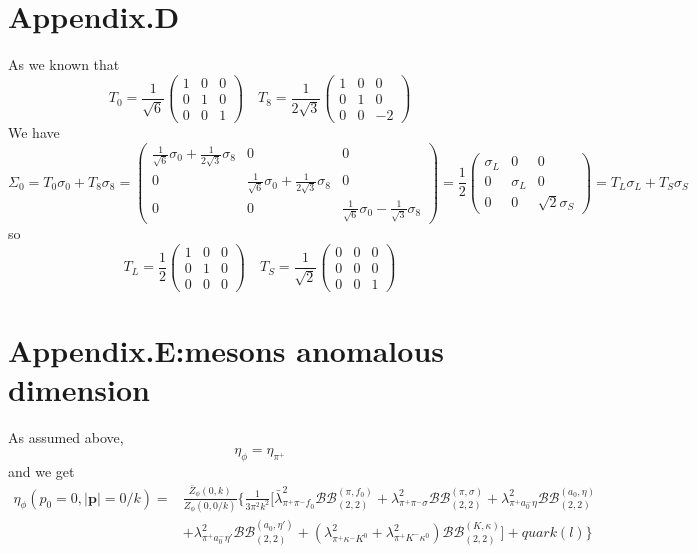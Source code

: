 \documentclass[12pt]{article}
\begin{document}
\section{Appendix.D}
As we known that
\begin{equation}
T_0=\frac{1}{\sqrt{6}}
\begin{pmatrix}
1& 0 & 0\\
0 & 1 & 0 \\
0 & 0 & 1
\end{pmatrix} 
\quad
T_8=\frac{1}{2\sqrt{3}}
\begin{pmatrix}
1& 0 & 0\\
0 & 1 & 0 \\
0 & 0 & -2
\end{pmatrix} 
\end{equation}
We have
\begin{equation}
\Sigma_0=T_0 \sigma_0 +T_8 \sigma_8 
=\begin{pmatrix}
\frac{1}{\sqrt{6}}\sigma_0+\frac{1}{2\sqrt{3}}\sigma_8 & 0 & 0\\
0 & \frac{1}{\sqrt{6}}\sigma_0+\frac{1}{2\sqrt{3}}\sigma_8 & 0 \\
0 & 0 & \frac{1}{\sqrt{6}}\sigma_0-\frac{1}{\sqrt{3}}\sigma_8 
\end{pmatrix}
=\frac{1}{2}\begin{pmatrix}
\sigma_L & 0 & 0\\
0 & \sigma_L & 0 \\
0 & 0 & \sqrt{2} \sigma_S
\end{pmatrix}
=T_L \sigma_L +T_S \sigma_S
\end{equation}
so 
\begin{equation}
T_L=\frac{1}{2}
\begin{pmatrix}
1& 0 & 0\\
0 & 1 & 0 \\
0 & 0 & 0
\end{pmatrix} 
\quad
T_S=\frac{1}{\sqrt{2}}
\begin{pmatrix}
0& 0 & 0\\
0 & 0 & 0 \\
0 & 0 & 1
\end{pmatrix} 
\end{equation}

\section{Appendix.E:mesons anomalous dimension}
As assumed above,
\begin{equation}
\eta_\phi=\eta_{\pi^+}
\end{equation}
and we get
\begin{align}
\eta_{\phi}(p_0=0,|\textbf{p}|=0/k)=&\frac{\bar Z_{\phi}(0,k)}{Z_{\phi}(0,0/k)}\bigg\{\frac{1}{3 \pi^2 k^2}\big[\bar \lambda_{\pi^+ \pi^- f_0}^2 \mathcal{BB}_{(2,2)}^{(\pi,f_0)}+\lambda_{\pi^+ \pi^- \sigma}^2 \mathcal{BB}_{(2,2)}^{(\pi,\sigma)}+\lambda_{\pi^+ a_0^- \eta}^2\mathcal{BB}_{(2,2)}^{(a_0,\eta)} \nonumber \\ 
&+\lambda_{\pi^+ a_0^- \eta'}^2\mathcal{BB}_{(2,2)}^{(a_0,\eta')} +(\lambda_{\pi^+ \kappa^- K^0}^2+\lambda_{\pi^+ K^- \kappa^0}^2)\mathcal{BB}_{(2,2)}^{(K,\kappa)}\big] +quark(l)\bigg \}
\end{align}
\end{document}
